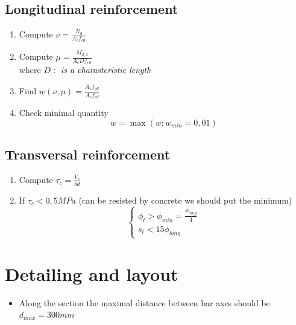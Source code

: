 \documentclass[landscape]{article}
\begin{document}
\begin{multicols*}{2}
  \subsection{Longitudinal reinforcement} %
  \label{sub:longitudinal_reinforcement}
  \begin{enumerate}
    \item Compute $\nu = \frac{N_d}{A_c f_{cd}}$
    \item Compute $\mu = \frac{M_{d,2}}{A_c D f_{cd}}$\\
    where $D:\emph{ is a charasteristic length}$
    \item Find $w (\nu, \mu) = \frac{A_s f_{yd}}{A_c f_{cd}}$
    \item Check minimal quantity
    \[
      w = \max(w;w_{min}=0,01)
    \]
  \end{enumerate}

  \subsection{Transversal reinforcement} %
  \label{sub:transversal_reinforcement}
  \begin{enumerate}
    \item Compute 
    $\tau_c = \frac{V_c}{bd}$
    \item If $\tau_c<0,5 MPa$ (can be resisted by concrete we should put the minimum)
    \begin{equation}
      \begin{cases}
        \phi_{t}>\phi_{min} = \frac{\phi_{long}}{4}\\
        s_{t}< 15 \phi_{long}
      \end{cases}
    \end{equation}
  \end{enumerate}

  \section{Detailing and layout} %
  \label{sec:detailing_and_layout}
  \begin{itemize}
    \item Along the section the maximal distance between bar axes should be $d_{max}=300mm$
  \end{itemize}
  

\newpage

\nocite{*}
\printbibliography
\end{multicols*}
\end{document}
